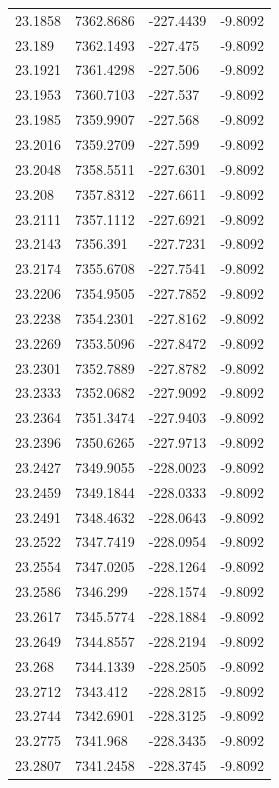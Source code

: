 \begin{table}[H]
\begin{tabular}{llll}
23.1858 & 7362.8686 & -227.4439 & -9.8092 \\
23.189 & 7362.1493 & -227.475 & -9.8092 \\
23.1921 & 7361.4298 & -227.506 & -9.8092 \\
23.1953 & 7360.7103 & -227.537 & -9.8092 \\
23.1985 & 7359.9907 & -227.568 & -9.8092 \\
23.2016 & 7359.2709 & -227.599 & -9.8092 \\
23.2048 & 7358.5511 & -227.6301 & -9.8092 \\
23.208 & 7357.8312 & -227.6611 & -9.8092 \\
23.2111 & 7357.1112 & -227.6921 & -9.8092 \\
23.2143 & 7356.391 & -227.7231 & -9.8092 \\
23.2174 & 7355.6708 & -227.7541 & -9.8092 \\
23.2206 & 7354.9505 & -227.7852 & -9.8092 \\
23.2238 & 7354.2301 & -227.8162 & -9.8092 \\
23.2269 & 7353.5096 & -227.8472 & -9.8092 \\
23.2301 & 7352.7889 & -227.8782 & -9.8092 \\
23.2333 & 7352.0682 & -227.9092 & -9.8092 \\
23.2364 & 7351.3474 & -227.9403 & -9.8092 \\
23.2396 & 7350.6265 & -227.9713 & -9.8092 \\
23.2427 & 7349.9055 & -228.0023 & -9.8092 \\
23.2459 & 7349.1844 & -228.0333 & -9.8092 \\
23.2491 & 7348.4632 & -228.0643 & -9.8092 \\
23.2522 & 7347.7419 & -228.0954 & -9.8092 \\
23.2554 & 7347.0205 & -228.1264 & -9.8092 \\
23.2586 & 7346.299 & -228.1574 & -9.8092 \\
23.2617 & 7345.5774 & -228.1884 & -9.8092 \\
23.2649 & 7344.8557 & -228.2194 & -9.8092 \\
23.268 & 7344.1339 & -228.2505 & -9.8092 \\
23.2712 & 7343.412 & -228.2815 & -9.8092 \\
23.2744 & 7342.6901 & -228.3125 & -9.8092 \\
23.2775 & 7341.968 & -228.3435 & -9.8092 \\
23.2807 & 7341.2458 & -228.3745 & -9.8092 \\

\end{tabular}
\end{table}
